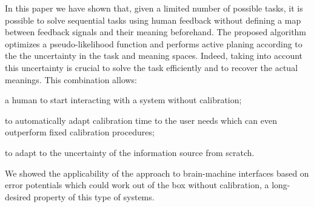In this paper we have shown that, given a limited number of possible tasks, it is possible to solve sequential tasks using human feedback without defining a map between feedback signals and their meaning beforehand. The proposed algorithm optimizes a pseudo-likelihood function and performs active planing according to the the uncertainty in the task and meaning spaces. Indeed, taking into account this uncertainty is crucial to solve the task efficiently and to recover the actual meanings. This combination allows: 
\begin{inparaenum}[a)]
\item a human to start interacting with a system without calibration;
\item to automatically adapt calibration time to the user needs which can even outperform fixed calibration procedures; 
\item to adapt to the uncertainty of the information source from scratch.
\end{inparaenum}
We showed the applicability of the approach to brain-machine interfaces based on error potentials which could work out of the box without calibration, a long-desired property of this type of systems.  